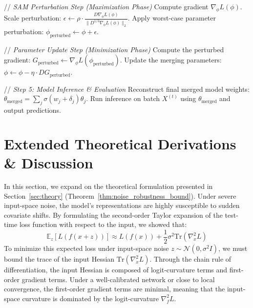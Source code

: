 \documentclass{article}
\theoremstyle{plain}
\theoremstyle{definition}
\theoremstyle{remark}
\begin{document}
\begin{algorithm}[H]
\begin{algorithmic}[1]
        \STATE // \textit{SAM Perturbation Step (Maximization Phase)}
        \STATE Compute gradient $\nabla_\phi L(\phi)$.
        \STATE Scale perturbation: $\epsilon \gets \rho \cdot \frac{D \nabla_\phi L(\phi)}{\|D^{1/2} \nabla_\phi L(\phi)\|_2}$.
        \STATE Apply worst-case parameter perturbation: $\phi_{\text{perturbed}} \gets \phi + \epsilon$.
        
        \STATE // \textit{Parameter Update Step (Minimization Phase)}
        \STATE Compute the perturbed gradient: $G_{\text{perturbed}} \gets \nabla_\phi L(\phi_{\text{perturbed}})$.
        \STATE Update the merging parameters: $\phi \gets \phi - \eta \cdot D G_{\text{perturbed}}$.
    \ENDFOR
    
    \STATE // \textit{Step 5: Model Inference \& Evaluation}
    \STATE Reconstruct final merged model weights: $\theta_{\text{merged}} = \sum_j \sigma(w_j + \delta_j) \theta_j$.
    \STATE Run inference on batch $X^{(t)}$ using $\theta_{\text{merged}}$ and output predictions.
\ENDFOR
\end{algorithmic}
\end{algorithm}

\section{Extended Theoretical Derivations \& Discussion}
\label{appendix:theory}

In this section, we expand on the theoretical formulation presented in Section~\ref{sec:theory} (Theorem~\ref{thm:noise_robustness_bound}). Under severe input-space noise, the model's representations are highly susceptible to sudden covariate shifts. By formulating the second-order Taylor expansion of the test-time loss function with respect to the input, we showed that:
\begin{equation}
\mathbb{E}_z [L(f(x + z))] \approx L(f(x)) + \frac{1}{2} \sigma^2 \text{Tr}(\nabla^2_x L)
\end{equation}
To minimize this expected loss under input-space noise $z \sim \mathcal{N}(0, \sigma^2 I)$, we must bound the trace of the input Hessian $\text{Tr}(\nabla^2_x L)$. Through the chain rule of differentiation, the input Hessian is composed of logit-curvature terms and first-order gradient terms. Under a well-calibrated network or close to local convergence, the first-order gradient terms are minimal, meaning that the input-space curvature is dominated by the logit-curvature $\nabla^2_f L$.
\end{document}
